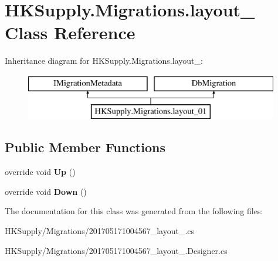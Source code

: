 \hypertarget{class_h_k_supply_1_1_migrations_1_1layout__01}{}\section{H\+K\+Supply.\+Migrations.\+layout\+\_ Class Reference}
\label{class_h_k_supply_1_1_migrations_1_1layout__01}
Inheritance diagram for H\+K\+Supply.\+Migrations.\+layout\+\_\+:\begin{figure}[H]
\begin{center}
\leavevmode
\includegraphics[height=2.000000cm]{class_h_k_supply_1_1_migrations_1_1layout__01}
\end{center}
\end{figure}
\subsection*{Public Member Functions}
\begin{DoxyCompactItemize}
\item 
\mbox{\label{class_h_k_supply_1_1_migrations_1_1layout__01_a1bffa66cae00dfc3a0c5dc28ab98ab9e}} 
override void {\bfseries Up} ()
\item 
\mbox{\label{class_h_k_supply_1_1_migrations_1_1layout__01_ab21b3cdc421bdaad10413877b25e775a}} 
override void {\bfseries Down} ()
\end{DoxyCompactItemize}


The documentation for this class was generated from the following files\+:\begin{DoxyCompactItemize}
\item 
H\+K\+Supply/\+Migrations/201705171004567\+\_\+layout\+\_.\+cs\item 
H\+K\+Supply/\+Migrations/201705171004567\+\_\+layout\+\_.\+Designer.\+cs\end{DoxyCompactItemize}
